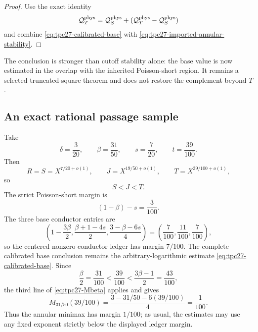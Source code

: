 \begin{proof}
Use the exact identity
\[
 \mathcal Q_T^{\rm phys}
 =\mathcal Q_S^{\rm phys}
 +(\mathcal Q_T^{\rm phys}-\mathcal Q_S^{\rm phys})
\]
and combine \eqref{eq:tpc27-calibrated-base} with
\eqref{eq:tpc27-imported-annular-stability}.
\end{proof}

The conclusion is stronger than cutoff stability alone: the base value
is now estimated in the overlap with the inherited Poisson-short
region.  It remains a selected truncated-square theorem and does not
restore the complement beyond \(T\).

\subsection{An exact rational passage sample}

Take
\begin{equation}
 \delta=\frac3{20},
 \qquad
 \beta=\frac{31}{50},
 \qquad
 s=\frac7{20},
 \qquad
 t=\frac{39}{100}.
 \label{eq:tpc27-strict-sample}
\end{equation}
Then
\begin{equation}
 R=S=X^{7/20+o(1)},
 \qquad
 J=X^{19/50+o(1)},
 \qquad
 T=X^{39/100+o(1)},
 \label{eq:tpc27-strict-order}
\end{equation}
so
\begin{equation}
 S<J<T.
 \label{eq:tpc27-crossing-order}
\end{equation}
The strict Poisson-short margin is
\begin{equation}
 (1-\beta)-s
 =\frac3{100}.
 \label{eq:tpc27-single-margin}
\end{equation}
The three base conductor entries are
\begin{equation}
 \left(
 1-\frac{3\beta}{2},
 \frac{\beta+1-4s}{2},
 \frac{3-\beta-6s}{4}
 \right)
 =\left(\frac7{100},\frac{11}{100},\frac7{100}\right),
 \label{eq:tpc27-base-sample-ledger}
\end{equation}
so the centered nonzero conductor ledger has margin \(7/100\).  The complete
calibrated base conclusion remains the arbitrary-logarithmic estimate
\eqref{eq:tpc27-calibrated-base}.  Since
\begin{equation}
 \frac\beta2=\frac{31}{100}
 <\frac{39}{100}
 <\frac{3\beta-1}{2}=\frac{43}{100},
\end{equation}
the third line of \eqref{eq:tpc27-Mbeta} applies and gives
\begin{equation}
 M_{31/50}(39/100)
 =\frac{3-31/50-6(39/100)}4
 =\frac1{100}.
 \label{eq:tpc27-annular-sample-saving}
\end{equation}
Thus the annular minimax has margin \(1/100\); as usual, the estimates
may use any fixed exponent strictly below the displayed ledger margin.

